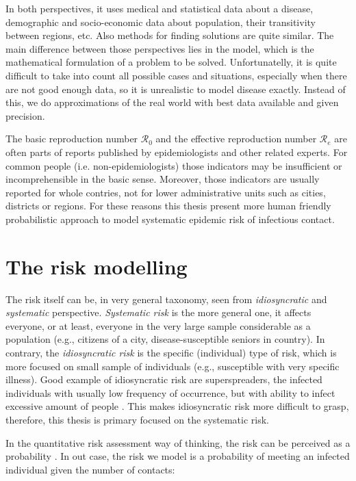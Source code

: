 \documentclass[
  digital, %
  oneside, %
  lof,     %
  lot,     %
]{fithesis4}
\begin{document}
In both perspectives, it uses medical and statistical data about a 
disease, demographic and socio-economic data about population, 
their transitivity between regions, etc. 
Also methods for finding solutions are quite similar. 
The main difference between those perspectives lies in the model, 
which is the mathematical formulation of a problem to be solved. 
Unfortunatelly, it is quite difficult to take into count all 
possible cases and situations, especially when there are not 
good enough data, so it is unrealistic to model disease exactly. 
Instead of this, we do approximations of the real world 
with best data available and given precision.

The basic reproduction number $\mathcal{R}_0$ and the effective 
reproduction number $\mathcal{R}_e$ are often parts of reports 
published by epidemiologists and other related experts.
For common people (i.e. non-epidemiologists) those indicators 
may be insufficient or incomprehensible in the basic sense.
Moreover, those indicators are usually reported for whole contries, 
not for lower administrative units such as cities, districts or regions. 
For these reasons this thesis present more human friendly 
probabilistic approach to model systematic epidemic risk of
infectious contact.


\section{The risk modelling}

The risk itself can be, in very general taxonomy, seen from
\textit{idiosyncratic} and \textit{systematic} perspective.
\textit{Systematic risk} is the more general one, it affects everyone, 
or at least, everyone in the very large sample considerable as a population
(e.g., citizens of a city, disease-susceptible seniors in country).
In contrary, the \textit{idiosyncratic risk} is the specific (individual) type of risk,
which is more focused on small sample of individuals (e.g., susceptible with very specific illness).
Good example of idiosyncratic risk are superspreaders, the infected
individuals with usually low frequency of occurrence, but with ability to
infect excessive amount of people \cite[Chapter~4]{brauer2008}.
This makes idiosyncratic risk more difficult to grasp, therefore, this thesis 
is primary focused on the systematic risk.

In the quantitative risk assessment way of thinking, the risk can be
perceived as a probability \cite[Chapter~14]{bahr2014}.
In out case, the risk we model is a probability of meeting an
infected individual given the number of contacts:
\end{document}
